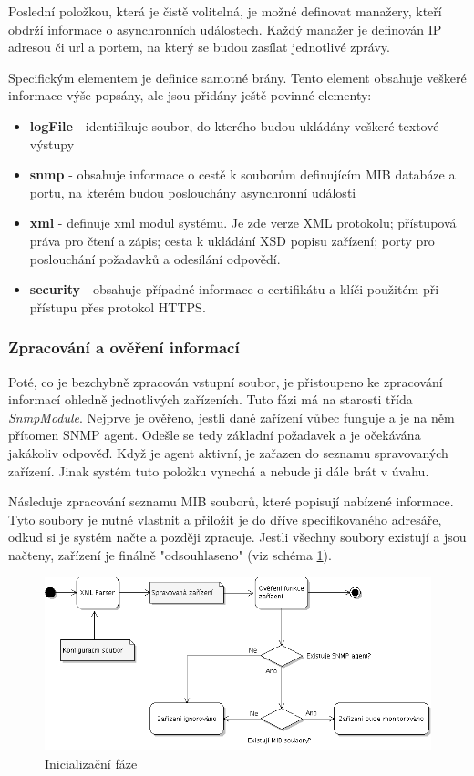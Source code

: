 Poslední položkou, která je čistě volitelná, je možné definovat manažery, kteří obdrží informace o asynchronních událostech. Každý 
manažer je definován IP adresou či url a portem, na který se budou zasílat jednotlivé zprávy.

Specifickým elementem je definice samotné brány. Tento element obsahuje veškeré informace výše popsány, ale jsou přidány ještě povinné elementy:
\begin{itemize}
	\item \textbf{logFile} - identifikuje soubor, do kterého budou ukládány veškeré textové výstupy
	\item \textbf{snmp}    - obsahuje informace o cestě k souborům definujícím MIB databáze a portu, na kterém budou poslouchány asynchronní události
	\item \textbf{xml}     - definuje xml modul systému. Je zde verze XML protokolu; přístupová práva pro čtení a zápis; cesta k ukládání XSD popisu zařízení;
	porty pro poslouchání požadavků a odesílání odpovědí.
	\item \textbf{security} - obsahuje případné informace o certifikátu a klíči použitém při přístupu přes protokol HTTPS.
\end{itemize}

\subsubsection*{Zpracování a ověření informací}
Poté, co je bezchybně zpracován vstupní soubor, je přistoupeno ke zpracování informací ohledně jednotlivých zařízeních. Tuto fázi má
na starosti třída \textit{SnmpModule}. Nejprve je ověřeno, jestli dané zařízení vůbec funguje a je na něm přítomen SNMP agent. Odešle
se tedy základní požadavek a je očekávána jakákoliv odpověď. Když je agent aktivní, je zařazen do seznamu spravovaných zařízení. Jinak
systém tuto položku vynechá a nebude ji dále brát v úvahu. 

Následuje zpracování seznamu MIB souborů, které popisují nabízené informace. Tyto soubory je nutné vlastnit a přiložit je do dříve specifikovaného
adresáře, odkud si je systém načte a později zpracuje. Jestli všechny soubory existují a jsou načteny, zařízení je finálně "odsouhlaseno" (viz schéma
\ref{obr_impl_inicializacni_faze}).

\begin{figure}[htp]
	\begin{center}
		\includegraphics[width=15cm]{obrazky/05_inicializacni_faze.png}
		\caption{Inicializační fáze}
		\label{obr_impl_inicializacni_faze}
	\end{center}
\end{figure}

